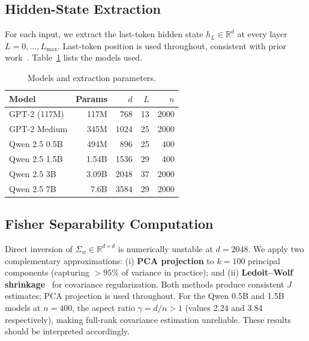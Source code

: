 \documentclass[onecolumn]{jmlr}
\begin{document}
\subsection{Hidden-State Extraction}
\label{sec:setup-extraction}

For each input, we extract the last-token hidden state $h_L \in \mathbb{R}^d$
at every layer $L = 0, \ldots, L_{\max}$.  Last-token position is used
throughout, consistent with prior work~\citep{azaria2023internal,
du2024haloscope}.  Table~\ref{tab:models} lists the models used.

\begin{table}[!htbp]
\centering
\caption{Models and extraction parameters.}
\label{tab:models}
\small
\setlength{\tabcolsep}{4pt}
\begin{tabular}{lrrrr}
\toprule
\textbf{Model} & \textbf{Params} & $d$ & $L$ & $n$ \\
\midrule
GPT-2 (117M)       & 117M  & 768  & 13 & 2000 \\
GPT-2 Medium       & 345M  & 1024 & 25 & 2000 \\
Qwen 2.5 0.5B      & 494M  & 896  & 25 & 400  \\
Qwen 2.5 1.5B      & 1.54B & 1536 & 29 & 400  \\
Qwen 2.5 3B        & 3.09B & 2048 & 37 & 2000 \\
Qwen 2.5 7B        & 7.6B  & 3584 & 29 & 2000 \\
\bottomrule
\end{tabular}
\end{table}

\subsection{Fisher Separability Computation}
\label{sec:setup-fisher}

Direct inversion of $\Sigma_w \in \mathbb{R}^{d \times d}$ is numerically
unstable at $d = 2048$. We apply two complementary approximations:
(i) \textbf{PCA projection} to $k = 100$ principal components
(capturing $> 95\%$ of variance in practice); and
(ii) \textbf{Ledoit--Wolf shrinkage}~\citep{ledoit2004} for covariance
regularization. Both methods produce consistent $J$ estimates; PCA
projection is used throughout. For the Qwen 0.5B and 1.5B models at
$n = 400$, the aspect ratio $\gamma = d/n > 1$ (values 2.24 and 3.84
respectively), making full-rank covariance estimation unreliable. These
results should be interpreted accordingly.

\FloatBarrier
\end{document}
